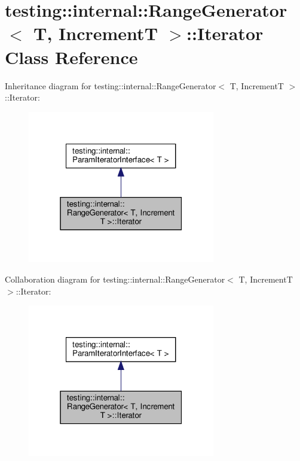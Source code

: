 \hypertarget{classtesting_1_1internal_1_1RangeGenerator_1_1Iterator}{}\section{testing\+:\+:internal\+:\+:Range\+Generator$<$ T, IncrementT $>$\+:\+:Iterator Class Reference}
\label{classtesting_1_1internal_1_1RangeGenerator_1_1Iterator}


Inheritance diagram for testing\+:\+:internal\+:\+:Range\+Generator$<$ T, IncrementT $>$\+:\+:Iterator\+:\nopagebreak
\begin{figure}[H]
\begin{center}
\leavevmode
\includegraphics[width=232pt]{classtesting_1_1internal_1_1RangeGenerator_1_1Iterator__inherit__graph}
\end{center}
\end{figure}


Collaboration diagram for testing\+:\+:internal\+:\+:Range\+Generator$<$ T, IncrementT $>$\+:\+:Iterator\+:\nopagebreak
\begin{figure}[H]
\begin{center}
\leavevmode
\includegraphics[width=232pt]{classtesting_1_1internal_1_1RangeGenerator_1_1Iterator__coll__graph}
\end{center}
\end{figure}
